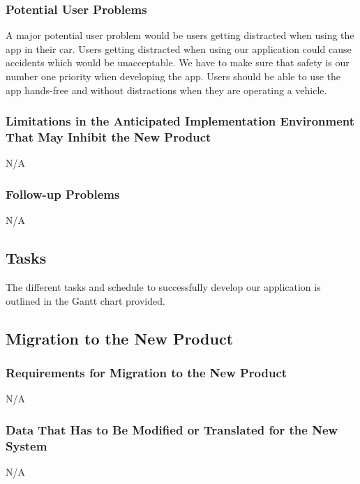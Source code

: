 \documentclass[12pt,letterpaper]{article}
\begin{document}
\subsubsection{Potential User Problems}
A major potential user problem would be users getting distracted when using the
app in their car. Users getting distracted when using our application could
cause accidents which would be unacceptable. We have to make sure that safety is
our number one priority when developing the app. Users should be able to use the
app hands-free and without distractions when they are operating a vehicle.

\subsubsection{Limitations in the Anticipated Implementation Environment That May Inhibit the New Product}

N/A

\subsubsection{Follow-up Problems}

N/A

\subsection{Tasks}
\label{subsec:Tasks}
The different tasks and schedule to successfully develop our application is
outlined in the Gantt chart provided.

\subsection{Migration to the New Product}

\subsubsection{Requirements for Migration to the New Product}
N/A

\subsubsection{Data That Has to Be Modified or Translated for the New System}
N/A
\end{document}
